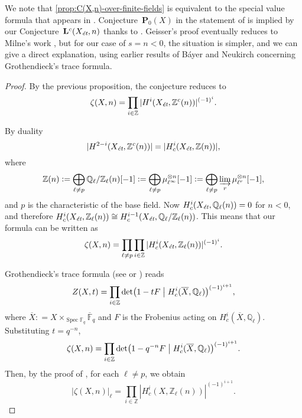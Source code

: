 \documentclass[10pt,a4paper,oneside]{article}
\DeclareMathOperator{\Spec}{Spec}
\newcommand{\FF}{\mathbb{F}}
\newcommand{\QQ}{\mathbb{Q}}
\newcommand{\ZZ}{\mathbb{Z}}
\renewcommand{\det}{\operatorname{det}}
\newcommand{\et}{\text{\it \'{e}t}}
\newcommand{\dfn}{\mathrel{\mathop:}=}
\theoremstyle{myplain}
\theoremstyle{mydefinition}
\numberwithin{equation}{section}
\begin{document}
We note that \eqref{prop:C(X,n)-over-finite-fields} is equivalent to the special
value formula that appears in
\cite[Theorem~4.5]{Geisser-2010-arithmetic-homology}.
Conjecture~$\mathbf{P}_0 (X)$ in the statement of
\cite[Theorem~4.5]{Geisser-2010-arithmetic-homology} is implied by our
Conjecture~$\mathbf{L}^c (X_\et,n)$ thanks to
\cite[Proposition~4.1]{Geisser-2010-arithmetic-homology}. Geisser's proof
eventually reduces to Milne's work \cite{Milne-1986}, but for our case of
$s = n < 0$, the situation is simpler, and we can give a direct explanation,
using earlier results of B\'{a}yer and Neukirch \cite{Bayer-Neukirch-1978}
concerning Grothendieck's trace formula.

\begin{proof}
  By the previous proposition, the conjecture reduces to
  $$\zeta (X,n) = \prod_{i \in \ZZ} |H^i (X_\et, \ZZ^c (n))|^{(-1)^i}.$$

  By duality \cite[Theorem~I]{Beshenov-Weil-etale-1}
  $$|H^{2-i} (X_\et, \ZZ^c (n))| = |H^i_c (X_\et, \ZZ (n))|,$$
  where
  \[ \ZZ (n) \dfn
    \bigoplus_{\ell \ne p} \QQ_\ell/\ZZ_\ell (n) [-1] \dfn
    \bigoplus_{\ell \ne p} \mu_{\ell^\infty}^{\otimes n} [-1] \dfn
    \bigoplus_{\ell \ne p} \varinjlim_r \mu_{\ell^r}^{\otimes n} [-1], \]
  and $p$ is the characteristic of the base field.
  Now $H^i_c (X_\et, \QQ_\ell (n)) = 0$ for $n < 0$, and therefore
  $H^i_c (X_\et, \ZZ_\ell (n)) \cong H^{i-1}_c (X_\et, \QQ_\ell/\ZZ_\ell (n))$.
  This means that our formula can be written as
  \begin{equation}
    \label{eqn:zeta-X/Fq-product-formula}
    \zeta (X,n) =
    \prod_{\ell \ne p} \prod_{i \in \ZZ} |H^i_c (X_\et, \ZZ_\ell (n))|^{(-1)^i}.
  \end{equation}

  Grothendieck's trace formula (see \cite{Grothendieck-FL} or
  \cite[Rapport]{SGA4-1-2}) reads
  \[ Z (X,t) =
    \prod_{i \in \ZZ} \det \bigl(1 - tF \bigm| H^i_c (\overline{X}, \QQ_\ell)\bigr)^{(-1)^{i+1}}, \]
  where $\overline{X} \dfn X \times_{\Spec \FF_q} \overline{\FF}_q$ and $F$ is
  the Frobenius acting on $H^i_c (\overline{X}, \QQ_\ell)$. Substituting
  $t = q^{-n}$,
  \[ \zeta (X,n) =
    \prod_{i \in \ZZ} \det \bigl(1 - q^{-n} F \bigm| H^i_c (\overline{X}, \QQ_\ell)\bigr)^{(-1)^{i+1}}. \]
  Then, by the proof of \cite[Theorem~(3.1)]{Bayer-Neukirch-1978}, for each
  $\ell \ne p$, we obtain
  \begin{equation}
    \label{eqn:bayer-neukirch}
    |\zeta (X,n)|_\ell =
    \prod_{i \in \ZZ} |H^i_c (X, \ZZ_\ell (n))|^{(-1)^{i+1}}.
  \end{equation}


\end{proof}
\end{document}
